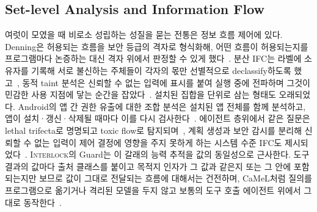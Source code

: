 \documentclass[acmsmall,screen,review,anonymous]{acmart}
\begin{document}
\subsection{Set-level Analysis and Information Flow}
\label{sec:related:setlevel}

여럿이 모였을 때 비로소 성립하는 성질을 묻는 전통은 정보 흐름 제어에 있다. Denning은 허용되는 흐름을 보안 등급의 격자로 형식화해, 어떤 흐름이 허용되는지를 프로그램마다 논증하는 대신 격자 위에서 판정할 수 있게 했다~\cite{denning1976lattice}. 분산 IFC는 라벨에 소유자를 기록해 서로 불신하는 주체들이 각자의 몫만 선별적으로 declassify하도록 했고~\cite{myers1997decentralized}, 동적 taint 분석은 신뢰할 수 없는 입력에 표시를 붙여 실행 중에 전파하며 그것이 민감한 사용 지점에 닿는 순간을 잡았다~\cite{newsome2005dynamic}. 설치된 집합을 단위로 삼는 형태도 오래되었다. Android의 앱 간 권한 유출에 대한 조합 분석은 설치된 앱 전체를 함께 분석하고, 앱이 설치·갱신·삭제될 때마다 이를 다시 검사한다~\cite{bagheri2015covert, li2015iccta}. 에이전트 층위에서 같은 질문은 lethal trifecta로 명명되고 toxic flow로 탐지되며~\cite{willison2025lethal, beurerkellner2025toxicflow, schneider2026securing}, 계획 생성과 보안 감시를 분리해 신뢰할 수 없는 입력이 제어 결정에 영향을 주지 못하게 하는 시스템 수준 IFC도 제시되었다~\cite{wu2024system}. \textsc{Interlock}의 Guard는 이 갈래의 능력 추적을 값의 동일성으로 근사한다. 도구 결과의 값마다 출처 클래스를 붙이고 목적지 인자가 그 값과 같은지 또는 그 안에 포함되는지만 보므로 값이 그대로 전달되는 흐름에 대해서는 건전하며, CaMeL처럼 질의를 프로그램으로 옮기거나 격리된 모델을 두지 않고 보통의 도구 호출 에이전트 위에서 그대로 동작한다~\cite{debenedetti2025defeating}.
\end{document}
